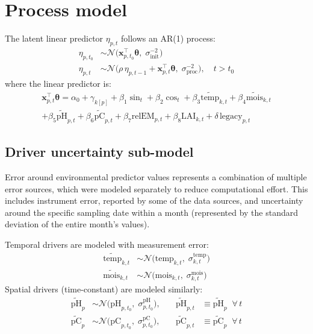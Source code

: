 \documentclass[11pt]{article}
\begin{document}
\section{Process model}

The latent linear predictor $\eta_{p,t}$ follows an AR(1) process:
\begin{align}
\eta_{p, t_0} &\sim \mathcal{N}\!\bigl(\mathbf{x}_{p,t_0}^{\top}\boldsymbol{\theta},\; \sigma_{\mathrm{init}}^{-2}\bigr) \\[4pt]
\eta_{p,t} &\sim \mathcal{N}\!\bigl(\rho\,\eta_{p,t-1} + \mathbf{x}_{p,t}^{\top}\boldsymbol{\theta},\; \sigma_{\mathrm{proc}}^{-2}\bigr), \quad t > t_0
\end{align}
where the linear predictor is:
\begin{multline}
\mathbf{x}_{p,t}^{\top}\boldsymbol{\theta} = \alpha_0 + \gamma_{k[p]} + \beta_1 \sin_t + \beta_2 \cos_t + \beta_3 \widetilde{\mathrm{temp}}_{k,t} + \beta_4 \widetilde{\mathrm{mois}}_{k,t} \\
+ \beta_5 \widetilde{\mathrm{pH}}_{p,t} + \beta_6 \widetilde{\mathrm{pC}}_{p,t} + \beta_7 \mathrm{relEM}_{p,t} + \beta_8 \mathrm{LAI}_{k,t} + \delta\,\mathrm{legacy}_{p,t}
\end{multline}

\subsection*{Driver uncertainty sub-model}

Error around environmental predictor values represents a combination of multiple error sources, which were modeled separately to reduce computational effort. This includes instrument error, reported by some of the data sources, and uncertainty around the specific sampling date within a month (represented by the standard deviation of the entire month's values).

Temporal drivers are modeled with measurement error:
\begin{align}
\widetilde{\mathrm{temp}}_{k,t} &\sim \mathcal{N}\!\bigl(\mathrm{temp}_{k,t},\; \sigma^{\mathrm{temp}}_{k,t}\bigr) \\
\widetilde{\mathrm{mois}}_{k,t} &\sim \mathcal{N}\!\bigl(\mathrm{mois}_{k,t},\; \sigma^{\mathrm{mois}}_{k,t}\bigr)
\end{align}
Spatial drivers (time-constant) are modeled similarly:
\begin{align}
\widetilde{\mathrm{pH}}_{p} &\sim \mathcal{N}\!\bigl(\mathrm{pH}_{p,t_0},\; \sigma^{\mathrm{pH}}_{p,t_0}\bigr), &\quad \widetilde{\mathrm{pH}}_{p,t} &\equiv \widetilde{\mathrm{pH}}_p \;\;\forall\, t \\
\widetilde{\mathrm{pC}}_{p} &\sim \mathcal{N}\!\bigl(\mathrm{pC}_{p,t_0},\; \sigma^{\mathrm{pC}}_{p,t_0}\bigr), &\quad \widetilde{\mathrm{pC}}_{p,t} &\equiv \widetilde{\mathrm{pC}}_p \;\;\forall\, t
\end{align}
\end{document}
